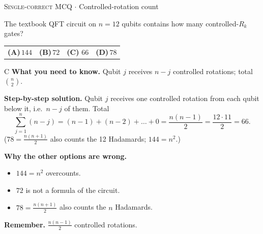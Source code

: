\documentclass[11pt,a4paper]{article}
\newcommand{\optlabel}[1]{\textbf{(#1)}}
\newcommand{\correctlabel}[1]{\textcolor{okgreen}{\textbf{(#1)}\,\ding{51}}}
\newenvironment{qitem}[1]{\begin{list}{}{\setlength{\leftmargin}{3.3em}\setlength{\labelwidth}{3.1em}%
  \setlength{\labelsep}{0.2em}\setlength{\topsep}{3pt}\setlength{\parsep}{3pt}}\item[\textbf{Q.#1}\hfill]}{\end{list}}
\newcommand{\qsep}{\par\vspace{2pt}{\color{black!15}\hrule}\vspace{4pt}}
\newcommand{\qmeta}[2]{{\footnotesize\color{black!60}\textsc{#1} \;$\cdot$\; #2}\par}
\begin{document}
\begin{qitem}{44}
\qmeta{Single-correct MCQ}{Controlled-rotation count}
The textbook QFT circuit on $n = 12$ qubits contains how many controlled-$R_k$ gates?
\par\smallskip\noindent\begin{tabularx}{\linewidth}{@{}*{4}{L}@{}}
\optlabel{A}\,$144$ & \optlabel{B}\,$72$ & \correctlabel{C}\,$66$ & \optlabel{D}\,$78$
\end{tabularx}
\end{qitem}
\begin{solbox}{C}
\textbf{\color{brand}What you need to know.} Qubit $j$ receives $n - j$ controlled rotations; total $\binom n2$.

\textbf{\color{brand}Step-by-step solution.} Qubit $j$ receives one controlled rotation from each qubit below it, i.e.\ $n - j$ of them. Total
\[ \sum_{j=1}^{n}(n - j) = (n-1) + (n-2) + \dots + 0 = \frac{n(n-1)}{2} = \frac{12\cdot11}{2} = 66 . \]
($78 = \frac{n(n+1)}{2}$ also counts the 12 Hadamards; $144 = n^2$.)

\textbf{\color{brand}Why the other options are wrong.}
\begin{itemize}[leftmargin=2.4em, itemsep=1pt, topsep=2pt]
\item[\textbf{(A)}] $144 = n^2$ overcounts.
\item[\textbf{(B)}] $72$ is not a formula of the circuit.
\item[\textbf{(D)}] $78 = \frac{n(n+1)}{2}$ also counts the $n$ Hadamards.
\end{itemize}
\textbf{\color{brand}Remember.} $\frac{n(n-1)}{2}$ controlled rotations.
\end{solbox}
\qsep
\end{document}
